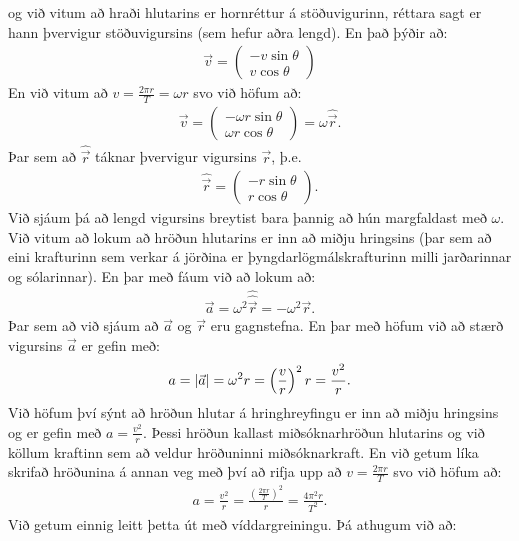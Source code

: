 og við vitum að hraði hlutarins er hornréttur á stöðuvigurinn, réttara sagt er hann þvervigur stöðuvigursins (sem hefur aðra lengd). En það þýðir að:
\begin{align*}
    \vec{v} = \begin{pmatrix} -v \sin\theta \\ v \cos\theta \end{pmatrix}
\end{align*}
En við vitum að $v = \frac{2\pi r}{T} = \omega r$ svo við höfum að:
\begin{align*}
    \vec{v} = \begin{pmatrix} -\omega r \sin\theta \\ \omega r \cos\theta \end{pmatrix} = \omega \hat{\vec{r}}.
\end{align*}
Þar sem að $\hat{\vec{r}}$ táknar þvervigur vigursins $\vec{r}$, þ.e.
\begin{align*}
    \hat{\vec{r}} = \begin{pmatrix} -r \sin\theta \\ r \cos\theta \end{pmatrix}.
\end{align*}
Við sjáum þá að lengd vigursins breytist bara þannig að hún margfaldast með $\omega$. Við vitum að lokum að hröðun hlutarins er inn að miðju hringsins (þar sem að eini krafturinn sem verkar á jörðina er þyngdarlögmálskrafturinn milli jarðarinnar og sólarinnar). En þar með fáum við að lokum að:
\begin{align*}
    \vec{a} = \omega^2 \hat{\hat{\vec{r}}} = -\omega^2 \vec{r}.
\end{align*}
Þar sem að við sjáum að $\vec{a}$ og $\vec{r}$ eru gagnstefna. En þar með höfum við að stærð vigursins $\vec{a}$ er gefin með:
\begin{align*}
    a = \abs{\vec{a}} = \omega^2 r = \left(\frac{v}{r}\right)^2 r = \frac{v^2}{r}.
\end{align*}
Við höfum því sýnt að hröðun hlutar á hringhreyfingu er inn að miðju hringsins og er gefin með $a = \frac{v^2}{r}$. Þessi hröðun kallast miðsóknarhröðun hlutarins og við köllum kraftinn sem að veldur hröðuninni miðsóknarkraft. En við getum líka skrifað hröðunina á annan veg með því að rifja upp að $v = \frac{2\pi r}{T}$ svo við höfum að:
\begin{align*}
    a = \frac{v^2}{r} = \frac{\left( \frac{2\pi r}{T} \right)^2}{r} = \frac{4\pi^2 r}{T^2}.
\end{align*}
Við getum einnig leitt þetta út með víddargreiningu. Þá athugum við að:
